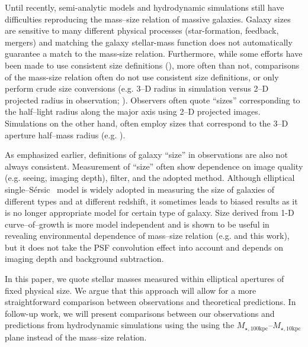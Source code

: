 \documentclass[a4paper,fleqn,usenatbib]{mnras}
\def\ser{{S\'{e}rsic\ }}
\def\minn{{$M_{\star,10\mathrm{kpc}}$}}
\def\mtot{{$M_{\star,100\mathrm{kpc}}$}}
\begin{document}
    Until recently, semi-analytic models and hydrodynamic simulations still have 
    difficulties reproducing the mass--size relation of massive galaxies. 
    Galaxy sizes are sensitive to many different physical processes (star-formation, 
    feedback, mergers) and matching the galaxy stellar-mass function does not 
    automatically guarantee a match to the mass-size relation. 
    Furthermore, while some efforts have been made to use consistent size definitions 
    (\citealt{McCarthy2017}), more often than not, comparisons of the mass-size relation 
    often do not use consistent size definitions, or only perform crude size conversions 
    (e.g. 3--D radius in simulation versus 2--D projected radius in observation; 
    \citealt{Genel2017}). 
    Observers often quote ``sizes'' corresponding to the half--light radius along the 
    major axis using 2--D projected images. 
    Simulations on the other hand, often employ sizes that correspond to the 3--D 
    aperture half--mass radius (e.g. \citealt{Price2017}). 
    
    As emphasized earlier, definitions of galaxy ``size'' in observations are also not 
    always consistent. 
    Measurement of ``size'' often show dependence on image quality (e.g. seeing, 
    imaging depth), filter, and the adopted method. 
    Although elliptical single--\ser{} model is widely adopted in measuring the 
    size of galaxies of different types and at different redshift, it sometimes leads
    to biased results as it is no longer appropriate model for certain type of galaxy. 
    Size derived from 1-D curve--of--growth is more model independent and is shown to 
    be useful in revealing environmental dependence of mass--size relation 
    (e.g. \citealt{Yoon2017} and this work), but it does not take the PSF convolution 
    effect into account and depends on imaging depth and background subtraction.

    In this paper, we quote stellar masses measured within elliptical apertures of 
    fixed physical size. 
    We argue that this approach will allow for a more straightforward comparison 
    between observations and theoretical predictions. 
    In follow-up work, we will present comparisons between our observations and 
    predictions from hydrodynamic simulations using the using the \mtot{}--\minn{} 
    plane instead of the mass--size relation. 
          

\end{document}
